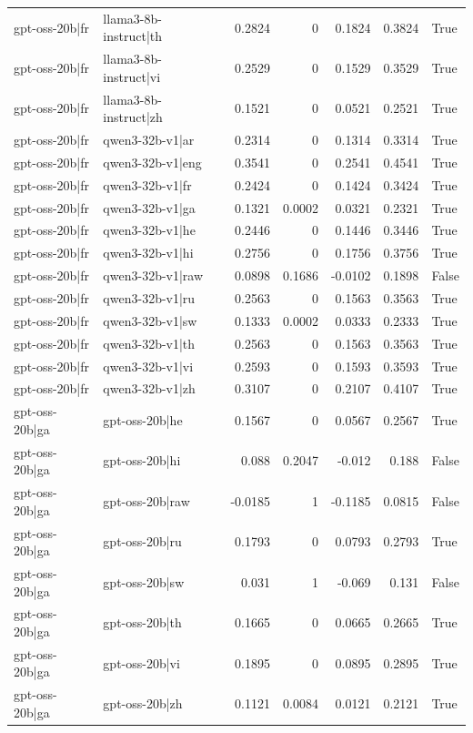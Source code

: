 \begin{table}
\begin{tabular}{l l r r r r l}
gpt-oss-20b|fr & llama3-8b-instruct|th & 0.2824 & 0 & 0.1824 & 0.3824 & True \\
gpt-oss-20b|fr & llama3-8b-instruct|vi & 0.2529 & 0 & 0.1529 & 0.3529 & True \\
gpt-oss-20b|fr & llama3-8b-instruct|zh & 0.1521 & 0 & 0.0521 & 0.2521 & True \\
gpt-oss-20b|fr & qwen3-32b-v1|ar & 0.2314 & 0 & 0.1314 & 0.3314 & True \\
gpt-oss-20b|fr & qwen3-32b-v1|eng & 0.3541 & 0 & 0.2541 & 0.4541 & True \\
gpt-oss-20b|fr & qwen3-32b-v1|fr & 0.2424 & 0 & 0.1424 & 0.3424 & True \\
gpt-oss-20b|fr & qwen3-32b-v1|ga & 0.1321 & 0.0002 & 0.0321 & 0.2321 & True \\
gpt-oss-20b|fr & qwen3-32b-v1|he & 0.2446 & 0 & 0.1446 & 0.3446 & True \\
gpt-oss-20b|fr & qwen3-32b-v1|hi & 0.2756 & 0 & 0.1756 & 0.3756 & True \\
gpt-oss-20b|fr & qwen3-32b-v1|raw & 0.0898 & 0.1686 & -0.0102 & 0.1898 & False \\
gpt-oss-20b|fr & qwen3-32b-v1|ru & 0.2563 & 0 & 0.1563 & 0.3563 & True \\
gpt-oss-20b|fr & qwen3-32b-v1|sw & 0.1333 & 0.0002 & 0.0333 & 0.2333 & True \\
gpt-oss-20b|fr & qwen3-32b-v1|th & 0.2563 & 0 & 0.1563 & 0.3563 & True \\
gpt-oss-20b|fr & qwen3-32b-v1|vi & 0.2593 & 0 & 0.1593 & 0.3593 & True \\
gpt-oss-20b|fr & qwen3-32b-v1|zh & 0.3107 & 0 & 0.2107 & 0.4107 & True \\
gpt-oss-20b|ga & gpt-oss-20b|he & 0.1567 & 0 & 0.0567 & 0.2567 & True \\
gpt-oss-20b|ga & gpt-oss-20b|hi & 0.088 & 0.2047 & -0.012 & 0.188 & False \\
gpt-oss-20b|ga & gpt-oss-20b|raw & -0.0185 & 1 & -0.1185 & 0.0815 & False \\
gpt-oss-20b|ga & gpt-oss-20b|ru & 0.1793 & 0 & 0.0793 & 0.2793 & True \\
gpt-oss-20b|ga & gpt-oss-20b|sw & 0.031 & 1 & -0.069 & 0.131 & False \\
gpt-oss-20b|ga & gpt-oss-20b|th & 0.1665 & 0 & 0.0665 & 0.2665 & True \\
gpt-oss-20b|ga & gpt-oss-20b|vi & 0.1895 & 0 & 0.0895 & 0.2895 & True \\
gpt-oss-20b|ga & gpt-oss-20b|zh & 0.1121 & 0.0084 & 0.0121 & 0.2121 & True \\

\end{tabular}
\end{table}
